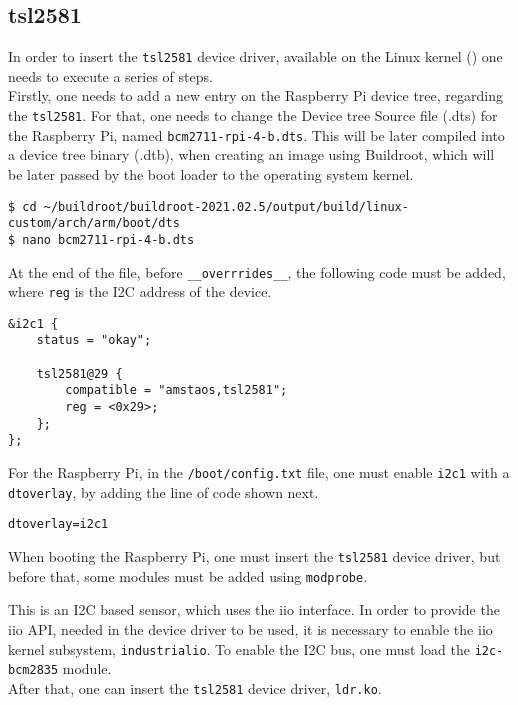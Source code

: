 \subsection{tsl2581}
In order to insert the \verb|tsl2581| device driver, available on the Linux kernel (\cite{code_tsl}) one needs to execute a series of steps.\\

Firstly, one needs to add a new entry on the Raspberry Pi device tree, regarding the \verb|tsl2581|. For that, one needs to change the Device tree Source file (.dts) for the Raspberry Pi, named \verb|bcm2711-rpi-4-b.dts|. This will be later compiled into a device tree binary (.dtb), when creating an image using Buildroot, which will be later passed by the boot loader to the operating system kernel. \cite{dtb}

\begin{lstlisting}
$ cd ~/buildroot/buildroot-2021.02.5/output/build/linux-custom/arch/arm/boot/dts
$ nano bcm2711-rpi-4-b.dts
\end{lstlisting}

At the end of the file, before \verb|__overrrides__|, the following code must be added, where \verb|reg| is the I2C address of the device. \cite{tsl2583_txt} 

\begin{lstlisting}
&i2c1 {
	status = "okay";
	
	tsl2581@29 {
		compatible = "amstaos,tsl2581";
		reg = <0x29>;
	};
};
\end{lstlisting}

For the Raspberry Pi, in the \verb|/boot/config.txt| file, one must enable \verb|i2c1| with a \verb|dtoverlay|, by adding the line of code shown next.
\begin{lstlisting}
dtoverlay=i2c1
\end{lstlisting}

When booting the Raspberry Pi, one must insert the \verb|tsl2581| device driver, but before that, some modules must be added using \verb|modprobe|.

This is an I2C based sensor, which uses the \ac{iio} interface. In order to provide the \ac{iio} API, needed in the device driver to be used, it is necessary to enable the \ac{iio} kernel subsystem, \verb|industrialio|. To enable the I2C bus, one must load the \verb|i2c-bcm2835| module. \cite{i2c_bcm2835}\\

After that, one can insert the \verb|tsl2581| device driver, \verb|ldr.ko|.

